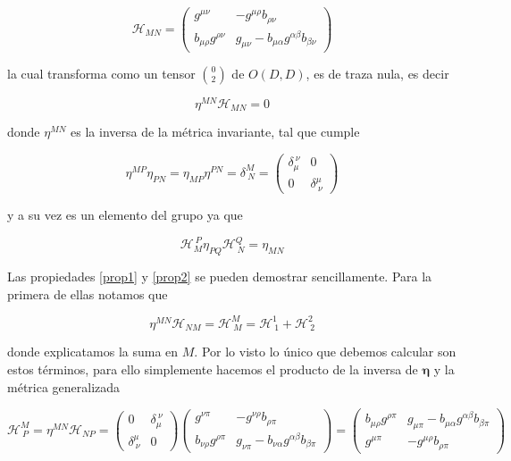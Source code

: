 \documentclass{article}
\numberwithin{equation}{section}
\begin{document}
\begin{equation}\label{HdeG}
\mathcal{H}_{MN}=
\begin{pmatrix}
g^{\mu\nu} & -g^{\mu\rho}b_{\rho\nu}\\
b_{\mu\rho}g^{\rho\nu} & g_{\mu\nu} -b_{\mu\alpha}g^{\alpha\beta}b_{\beta\nu} 
\end{pmatrix}
\end{equation}

la cual transforma como un tensor $ \binom{0}{2} $ de $ O(D,D) $, es de traza nula, es decir

\begin{equation}\label{prop1}
\eta^{MN}\mathcal{H}_{MN}=0
\end{equation}

donde $ \eta^{MN} $ es la inversa de la métrica invariante, tal que cumple

\begin{equation}\label{key}
\eta^{MP} \eta_{PN} = \eta_{MP} \eta^{PN} = \delta^M_{\ N} = 
\begin{pmatrix}
\delta_{\mu}^{ \ \nu} & 0 \\
0 & \delta^{\mu}_{ \ \nu} 
\end{pmatrix}
\end{equation}

y a su vez es un elemento del grupo ya que

\begin{equation}\label{prop2}
\mathcal{H}_M^{\ P}\eta_{PQ}\mathcal{H}^Q_{\ N} = \eta_{MN}
\end{equation}


Las propiedades \ref{prop1} y \ref{prop2} se pueden demostrar sencillamente. Para la primera de ellas notamos que

\begin{equation}\label{key}
\eta^{MN}\mathcal{H}_{NM} = \mathcal{H}^M_{\ M} = \mathcal{H}^1_{\ 1} + \mathcal{H}^2_{\ 2}
\end{equation}

donde explicatamos la suma en $ M $. Por lo visto lo único que debemos calcular son estos términos, para ello simplemente hacemos el producto de la inversa de $ \pmb{\eta} $ y la métrica generalizada

\begin{equation}\label{Hcruzado}
\mathcal{H}^M_{\ P} = \eta^{MN}\mathcal{H}_{NP} = \begin{pmatrix}
0 & \delta_{\mu}^{ \ \nu} \\
\delta^{\mu}_{ \ \nu} & 0 
\end{pmatrix}  
\begin{pmatrix}
g^{\nu\pi} & -g^{\nu\rho}b_{\rho\pi}\\
b_{\nu\rho}g^{\rho\pi} & g_{\nu\pi} -b_{\nu\alpha}g^{\alpha\beta}b_{\beta\pi}
\end{pmatrix} =  
\begin{pmatrix}
b_{\mu\rho}g^{\rho\pi} & g_{\mu\pi} -b_{\mu\alpha}g^{\alpha\beta}b_{\beta\pi}\\
g^{\mu\pi} & -g^{\mu\rho}b_{\rho\pi}
\end{pmatrix}
\end{equation}
\end{document}
